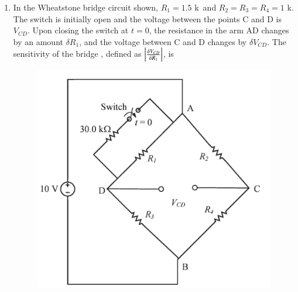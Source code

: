 \documentclass[journal,12pt,onecolumn]{IEEEtran}
\theoremstyle{remark}
\begin{document}
\begin{enumerate}
\item In the Wheatstone bridge circuit shown, $R_1 = 1.5$ k\ohm \ and $R_2 = R_3 = R_4 = 1$ k\ohm. The switch is initially open and the voltage between the points C and D is $V_{CD}$. Upon closing the switch at $t = 0$, the resistance in the arm AD changes by an amount $\delta R_1$, and the voltage between C and D changes by $\delta V_{CD}$. The sensitivity of the bridge , defined as $\left\vert\frac{\delta V_{CD}}{\delta R_1}\right\vert$, is \underline{\hspace{2cm}} 

\hfill{}
\begin{figure}[H]
\includegraphics[width = 0.6\columnwidth]{q65}
\caption*{}
\label{fig:q65}
\end{figure}
\end{enumerate}
\end{document}
